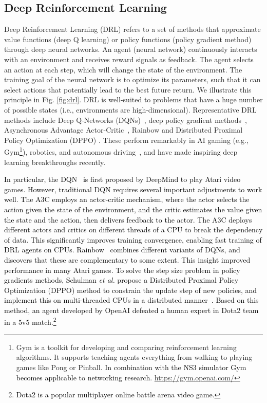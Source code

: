 \documentclass[journal,comsoc,letter]{IEEEtran}
\newcommand{\edit}[1]{\textcolor{black}{#1}}
\newcommand{\rev}[1]{\textcolor{black}{#1}}
\begin{document}
\subsection{Deep Reinforcement Learning}
Deep Reinforcement Learning (DRL) refers to a set of methods that approximate value functions (deep Q learning) or policy functions (policy gradient method) through deep neural networks. An agent (neural network) continuously interacts with an environment and receives reward signals as feedback. The agent selects an action at each step, which will change the state of the environment. The training goal of the neural network is to optimize its parameters, such that it can select actions that potentially lead to the best future return. We illustrate this principle in Fig. \ref{fig:drl}. DRL is well-suited to problems that have a huge number of possible states (i.e., environments are high-dimensional). Representative DRL methods include Deep Q-Networks (DQNs)~\cite{mnih2015human}, deep policy gradient methods~\cite{silver2016mastering}, Asynchronous Advantage Actor-Critic~\cite{mnih2016asynchronous}, {Rainbow \cite{hessel2017rainbow} and Distributed Proximal Policy Optimization (DPPO) \cite{schulman2017proximal}}. These perform remarkably in AI gaming (e.g., Gym\footnote{Gym is a toolkit for developing and comparing reinforcement learning algorithms. It supports teaching agents everything from walking to playing games like Pong or Pinball. \rev{In combination with the NS3 simulator Gym becomes applicable to networking research. \cite{gawlowicz2018ns3}} \url{https://gym.openai.com/}}), robotics, and autonomous driving~\cite{gu2016continuous, moravvcik2017deepstack, levine2016learning, sallab2017deep}, and have made inspiring deep learning breakthroughs recently. 

\edit{In particular, the DQN~\cite{mnih2015human} is first proposed by DeepMind to play Atari video games. However, traditional DQN requires several important adjustments to work well. The A3C \cite{mnih2016asynchronous} employs an actor-critic mechanism, where the actor selects the action given the state of the environment, and the critic estimates the value given the state and the action, then delivers feedback to the actor. The A3C deploys different actors and critics on different threads of a CPU to break the dependency of data. This significantly improves training convergence, enabling fast training of DRL agents on CPUs. Rainbow~\cite{hessel2017rainbow} combines different variants of DQNs, and discovers that these are complementary to some extent. This insight improved performance in many Atari games. To solve the step size problem in  policy gradients methods, Schulman \emph{et al.} propose a Distributed Proximal Policy Optimization (DPPO) method to constrain the update step of new policies, and implement this on multi-threaded CPUs in a distributed manner~\cite{schulman2017proximal}. Based on this method, an agent developed by OpenAI defeated a human expert in Dota2 team in a 5v5 match.\footnote{\edit{Dota2 is a popular multiplayer online battle arena video game.}}}
\end{document}
